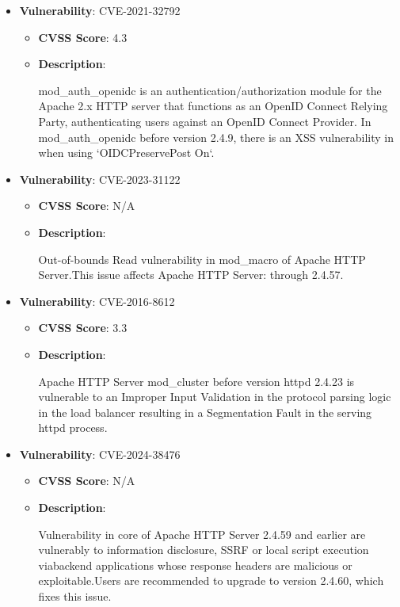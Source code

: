 \documentclass{article}
\begin{document}
\begin{itemize}
        \item \textbf{Vulnerability}: CVE-2021-32792
        \begin{itemize}
            \item \textbf{CVSS Score}:  4.3 
            \item \textbf{Description}:
            \parbox[t]{0.9\linewidth}{
                \ttfamily mod\_auth\_openidc is an authentication/authorization module for the Apache 2.x HTTP server that functions as an OpenID Connect Relying Party, authenticating users against an OpenID Connect Provider. In mod\_auth\_openidc before version 2.4.9, there is an XSS vulnerability in when using `OIDCPreservePost On`.
            }
        \end{itemize}
    
        \item \textbf{Vulnerability}: CVE-2023-31122
        \begin{itemize}
            \item \textbf{CVSS Score}:  N/A 
            \item \textbf{Description}:
            \parbox[t]{0.9\linewidth}{
                \ttfamily Out-of-bounds Read vulnerability in mod\_macro of Apache HTTP Server.This issue affects Apache HTTP Server: through 2.4.57.
            }
        \end{itemize}
    
        \item \textbf{Vulnerability}: CVE-2016-8612
        \begin{itemize}
            \item \textbf{CVSS Score}:  3.3 
            \item \textbf{Description}:
            \parbox[t]{0.9\linewidth}{
                \ttfamily Apache HTTP Server mod\_cluster before version httpd 2.4.23 is vulnerable to an Improper Input Validation in the protocol parsing logic in the load balancer resulting in a Segmentation Fault in the serving httpd process.
            }
        \end{itemize}
    
        \item \textbf{Vulnerability}: CVE-2024-38476
        \begin{itemize}
            \item \textbf{CVSS Score}:  N/A 
            \item \textbf{Description}:
            \parbox[t]{0.9\linewidth}{
                \ttfamily Vulnerability in core of Apache HTTP Server 2.4.59 and earlier are vulnerably to information disclosure, SSRF or local script execution viabackend applications whose response headers are malicious or exploitable.Users are recommended to upgrade to version 2.4.60, which fixes this issue.
            }
        \end{itemize}
    

\end{itemize}
\end{document}
